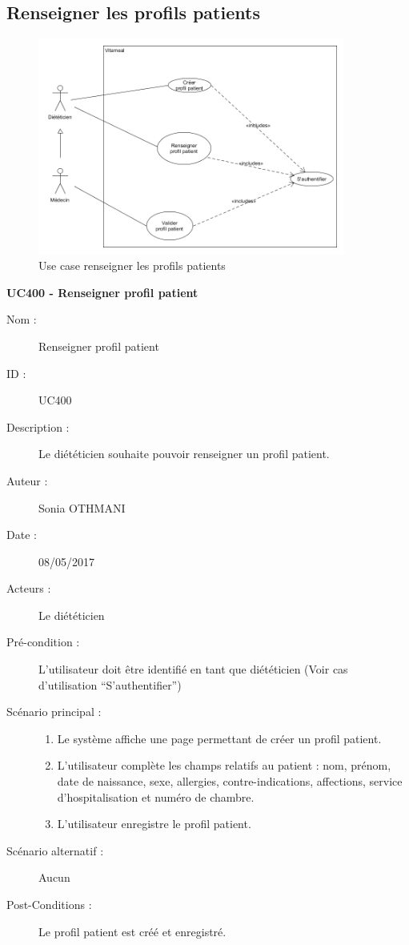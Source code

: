 \subsection{Renseigner les profils patients}

\begin{figure}[!h]
  \label{diagramme-renseigner-les-profils-patients}
  \centering
  \includegraphics[width=0.9\textwidth]{../../CasDUtilisations/ProfilPatient/UseCaseProfilPatient.png}
  \caption{Use case renseigner les profils patients}
\end{figure}

\textbf{UC400 - Renseigner profil patient}
\begin{description}
\item [Nom :] Renseigner profil patient
\item [ID :] UC400
\item [Description :] Le diététicien souhaite pouvoir renseigner un profil patient.
\item [Auteur :] Sonia OTHMANI
\item [Date :] 08/05/2017
\item [Acteurs :] Le diététicien
\item [Pré-condition :] L’utilisateur doit être identifié en tant que diététicien (Voir cas d’utilisation \enquote{S’authentifier})
\item [Scénario principal :]
  \begin{enumerate}
  \item Le système affiche une page permettant de créer un profil patient.
  \item L’utilisateur complète les champs relatifs au patient : nom, prénom, date de naissance, sexe, allergies, contre-indications, affections, service d'hospitalisation et numéro de chambre.
  \item L’utilisateur enregistre le profil patient.
 
  \end{enumerate}
\item [Scénario alternatif :] Aucun
\item [Post-Conditions :] Le profil patient est créé et enregistré.
\end{description}

